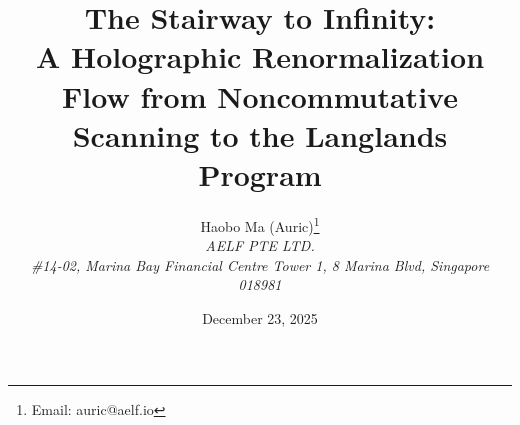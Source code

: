 \documentclass[11pt,a4paper]{article}
\title{The Stairway to Infinity:\\ A Holographic Renormalization Flow from Noncommutative Scanning to the Langlands Program}
\author{Haobo Ma (Auric)\thanks{Email: auric@aelf.io} \\
\textit{AELF PTE LTD.} \\
\textit{\#14-02, Marina Bay Financial Centre Tower 1, 8 Marina Blvd, Singapore 018981}}
\date{December 23, 2025}
\begin{document}
\maketitle














\FloatBarrier
\appendix


\FloatBarrier

\end{document}
